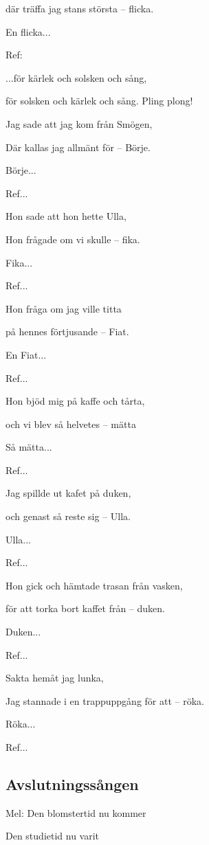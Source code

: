 där träffa jag stans största – flicka.

En flicka...\bigskip


Ref:

...för kärlek och solsken och sång,

för solsken och kärlek och sång. Pling plong!\bigskip

Jag sade att jag kom från Smögen,

Där kallas jag allmänt för – Börje.

Börje...\bigskip


Ref...\bigskip


Hon sade att hon hette Ulla,

Hon frågade om vi skulle – fika.

Fika...\bigskip


Ref...\bigskip


Hon fråga om jag ville titta

på hennes förtjusande – Fiat.

En Fiat...\bigskip


Ref...\bigskip


Hon bjöd mig på kaffe och tårta,

och vi blev så helvetes – mätta

Så mätta...\bigskip


Ref...\bigskip


Jag spillde ut kafet på duken,

och genast så reste sig – Ulla.

Ulla...\bigskip


Ref... \bigskip


Hon gick och hämtade trasan från vasken,

för att torka bort kaffet från – duken.

Duken...\bigskip


Ref...\bigskip


Sakta hemåt jag lunka,

Jag stannade i en trappuppgång för att – röka.

Röka...\bigskip


Ref... \bigskip


\subsection{\textbf{Avslutningssången}}

Mel: Den blomstertid nu kommer\bigskip

Den studietid nu varit

